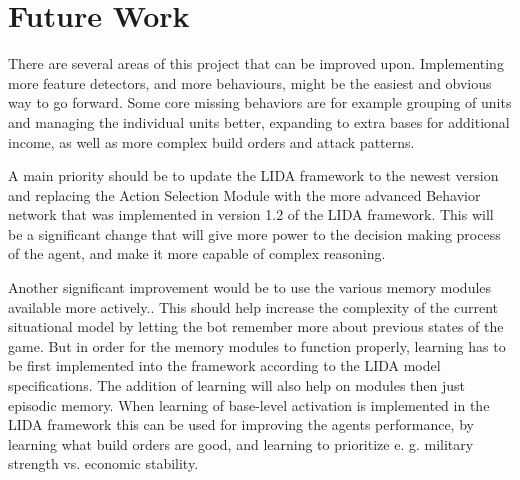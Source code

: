 \section{Future Work}
\label{sec:futurework}
There are several areas of this project that can be improved upon. Implementing more feature detectors, and more behaviours, might be the easiest and obvious way to go forward. Some core missing behaviors are for example grouping of units and managing the individual units better, expanding to extra bases for additional income, as well as more complex build orders and attack patterns.

A main priority should be to update the LIDA framework to the newest version and replacing the Action Selection Module with the more advanced Behavior network that was implemented in version 1.2 of the LIDA framework. This will be a significant change that will give more power to the decision making process of the agent, and make it more capable of complex reasoning.

Another significant improvement would be to use the various memory modules available more actively.\cite{franklin2007lida}. This should help increase the complexity of the current situational model by letting the bot remember more about previous states of the game. But in order for the memory modules to function properly, learning has to be first implemented into the framework according to the LIDA model specifications. The addition of learning will also help on modules then just episodic memory. When learning of base-level activation is implemented in the LIDA framework this can be used for improving the agents performance, by learning what build orders are good, and learning to prioritize e. g. military strength vs. economic stability.

